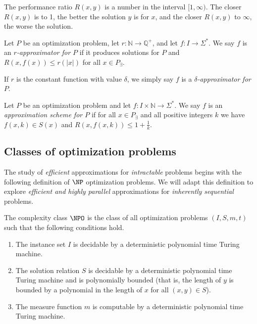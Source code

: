 The performance ratio $R(x, y)$ is a number in the interval $[1, \infty)$.
The closer $R(x, y)$ is to 1, the better the solution $y$ is for $x$, and the closer $R(x, y)$ to $\infty$, the worse the solution.

\begin{definition}
  Let $P$ be an optimization problem, let $r \colon \mathbb{N} \to \mathbb{Q}^+$, and let $f \colon I \to \Sigma^*$.
  We say $f$ is an \emph{$r$-approximator for $P$} if it produces solutions for $P$ and $R(x, f(x)) \leq r(|x|)$ for all $x \in P_\exists$.

  If $r$ is the constant function with value $\delta$, we simply say $f$ is a \emph{$\delta$-approximator for $P$}.
\end{definition}

\begin{definition}
  Let $P$ be an optimization problem and let $f \colon I \times \mathbb{N} \to \Sigma^*$.
  We say $f$ is an \emph{approximation scheme for $P$} if for all $x \in P_\exists$ and all positive integers $k$ we have $f(x, k)\in S(x)$ and $R(x, f(x, k)) \leq 1 + \frac{1}{k}$.
\end{definition}

\subsection{Classes of optimization problems}

The study of \emph{efficient} approximations for \emph{intractable} problems begins with the following definition of $\NP$ optimization problems.
We will adapt this definition to explore \emph{efficient and highly parallel} approximations for \emph{inherently sequential} problems.

\begin{definition}\label{def:npo}
  The complexity class $\NPO$ is the class of all optimization problems $(I, S, m, t)$ such that the following conditions hold.
  \begin{enumerate}
  \item The instance set $I$ is decidable by a deterministic polynomial time Turing machine.
  \item The solution relation $S$ is decidable by a deterministic polynomial time Turing machine and is polynomially bounded (that is, the length of $y$ is bounded by a polynomial in the length of $x$ for all $(x, y)\in S$).
  \item The measure function $m$ is computable by a deterministic polynomial time Turing machine.
  \end{enumerate}
\end{definition}

